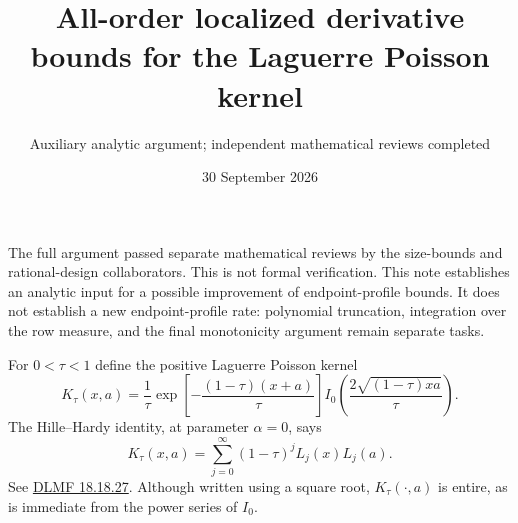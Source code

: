 \documentclass[11pt]{article}
\title{All-order localized derivative bounds for the Laguerre Poisson kernel}
\author{Auxiliary analytic argument; independent mathematical reviews completed}
\date{30 September 2026}
\begin{document}
\maketitle
The full argument passed separate mathematical reviews by the size-bounds
and rational-design collaborators. This is not formal verification.
This note establishes an analytic input for a possible improvement of
endpoint-profile bounds. It does not establish a new endpoint-profile
rate: polynomial truncation, integration over the row measure, and the
final monotonicity argument remain separate tasks.

For $0<\tau<1$ define the positive Laguerre Poisson kernel
\[
 K_\tau(x,a)=\frac1\tau
  \exp\!\left[-\frac{(1-\tau)(x+a)}\tau\right]
  I_0\!\left(\frac{2\sqrt{(1-\tau)xa}}\tau\right).
\]
The Hille--Hardy identity, at parameter $\alpha=0$, says
\[
 K_\tau(x,a)=\sum_{j=0}^{\infty}(1-\tau)^j L_j(x)L_j(a).
\]
See \href{https://dlmf.nist.gov/18.18.E27}{DLMF 18.18.27}.
Although written using a square root, $K_\tau(\cdot,a)$ is entire,
as is immediate from the power series of $I_0$.
\end{document}
